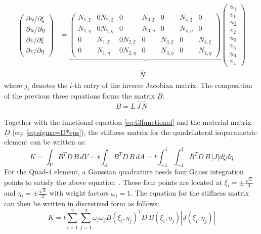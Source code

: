   \begin{align}
  \begin{pmatrix}
  {\partial u}/{\partial \xi} \\ {\partial u}/{\partial \eta} \\ {\partial v}/{\partial \xi} \\ {\partial v}/{\partial \eta}
  \end{pmatrix} &= \underbrace{\begin{pmatrix}
  N_{1,\xi}  & 0 N_{2,\xi}  & 0 & N_{3,\xi}  & 0 & N_{4,\xi}  & 0\\
  N_{1,\eta} & 0 N_{2,\eta} & 0 & N_{3,\eta} & 0 & N_{4,\eta} & 0\\
  0 & N_{1,\xi}  & 0 N_{2,\xi}  & 0 & N_{3,\xi}  & 0 & N_{4,\xi}\\
  0 & N_{1,\eta} & 0 N_{2,\eta} & 0 & N_{3,\eta} & 0 & N_{4,\eta}
  \end{pmatrix}} \begin{pmatrix}
  u_1\\v_1\\u_2\\v_2\\u_3\\v_3\\u_4\\v_4
  \end{pmatrix}\\
  &\qquad\qquad\qquad\qquad\qquad\quad\; \underline{\hat{N}} \nonumber
  \end{align}
  where $j_{i}$ denotes the $i$-th entry of the inverse Jacobian matrix.
  The composition of the previous three equations forms the matrix $\underline{B}$:
  \begin{equation}
  \underline{B} = \underline{L}\,\underline{\hat{J}}\,\underline{\hat{N}}
  \end{equation}
  

  Together with the functional equation \eqref{eq:t3functional} and the material matrix $\underline{D}$ (eq. \eqref{eq:sigma=D*eps}), the stiffness matrix for the quadrilateral isoparametric element can be written as:
  \begin{equation}
  \underline{K} = \int_V \underline{B}^T \underline{D}\,\underline{B}\, dV = t\int_A \underline{B}^T \underline{D}\,\underline{B}\, dA = t\int_{-1}^{1}\int_{-1}^{1} \underline{B}^T \underline{D}\,\underline{B}\, |\underline{J}| d\xi d\eta
  \end{equation}
  For the Quad-4 element, a Gaussian quadrature needs four Gauss integration points to satisfy the above equation~\cite{steinke2005finite}. These four points are located at $\xi_i = \pm \frac{\sqrt{3}}{3}$ and $\eta_i = \pm \frac{\sqrt{3}}{3}$ with weight factors $\omega_i = 1$. The equation for the stiffness matrix can then be written in discretized form as follows:
  \begin{equation}
  \underline{K} = t \sum_{i=1}^{2} \sum_{j=1}^{2} \omega_i \omega_j \underline{B}(\xi_i,\eta_j)^T \underline{D}\, \underline{B}(\xi_i,\eta_j) |\underline{J}(\xi_i,\eta_j)|
  \end{equation}
 
